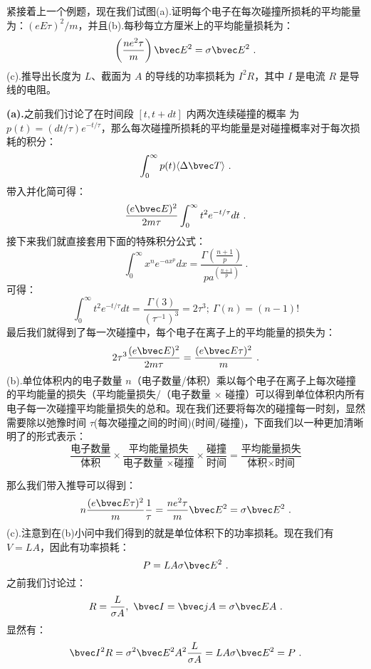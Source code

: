 \begin{exercise}{}
紧接着上一个例题，现在我们试图(a).证明每个电子在每次碰撞所损耗的平均能量为：$(eE\tau)^2/m$，并且(b).每秒每立方厘米上的平均能量损耗为：
\begin{equation}
\left(\frac{ne^2\tau}{m}\right)\bvec E^2=\sigma \bvec E^2~.
\end{equation}
(c).推导出长度为 $L$、截面为 $A$ 的导线的功率损耗为 $I^2R$，其中 $I$ 是电流 $R$ 是导线的电阻。

\textbf{(a).}之前我们讨论了在时间段 $[t, t + dt]$ 内两次连续碰撞的概率
为 $p(t)=(dt/\tau)e^{- t/\tau}$，那么每次碰撞所损耗的平均能量是对碰撞概率对于每次损耗的积分：
\begin{equation}
\int_0^\infty p(t) \langle\Delta\bvec T\rangle~.
\end{equation}
带入并化简可得：
\begin{equation}
\frac{(e\bvec E)^2}{2m\tau}\int_0^\infty t^2 e^{- t/\tau}dt~.
\end{equation}
接下来我们就直接套用下面的特殊积分公式：
\begin{equation}
\int_0^\infty x^n e^{-ax^p}dx = \frac{\Gamma\left(\frac{n+1}{p}\right)}{pa^{\left(\frac{n+1}{p}\right)}}~.
\end{equation}
可得：
\begin{equation}
\int_0^\infty t^2 e^{- t/\tau}dt=\frac{\Gamma(3)}{(\tau^{-1})^3}=2\tau^3;\ \Gamma(n)=(n-1)!
\end{equation}
最后我们就得到了每一次碰撞中，每个电子在离子上的平均能量的损失为：
\begin{equation}
2\tau^3\frac{(e\bvec E)^2}{2m\tau}=\frac{(e\bvec E\tau)^2}{m}~.
\end{equation}
(b).单位体积内的电子数量 $n$（电子数量/体积）乘以每个电子在离子上每次碰撞的平均能量的损失（平均能量损失/（电子数量 $\times$ 碰撞）可以得到单位体积内所有电子每一次碰撞平均能量损失的总和。现在我们还要将每次的碰撞每一时刻，显然需要除以弛豫时间 $\tau$(每次碰撞之间的时间)(时间/碰撞)，下面我们以一种更加清晰明了的形式表示：
\begin{equation}
\frac{\text{电子数量}}{\text{体积}}\times \frac{\text{平均能量损失}}{\text{电子数量 }\times \text{碰撞}}\times\frac{\text{碰撞}}{\text{时间}}=\frac{\text{平均能量损失}}{\text{体积}\times \text{时间}}
\end{equation}

那么我们带入推导可以得到：
\begin{equation}
n \frac{(e\bvec E\tau)^2}{m} \frac{1}{\tau} = \frac{ne^2\tau}{m}\bvec E^2 = \sigma \bvec E^2~.
\end{equation}
(c).注意到在(b)小问中我们得到的就是单位体积下的功率损耗。现在我们有 $V=LA$，因此有功率损耗：
\begin{equation}
P = LA\sigma \bvec E^2~.
\end{equation}
之前我们讨论过：
\begin{equation}
R = \frac{L}{\sigma A},\ \bvec I = \bvec j A=\sigma\bvec E A~.
\end{equation}
显然有：
\begin{equation}
\bvec I^2 R=\sigma^2\bvec E^2 A^2 \frac{L}{\sigma A} = LA\sigma \bvec E^2 = P~.
\end{equation}
\end{exercise}




